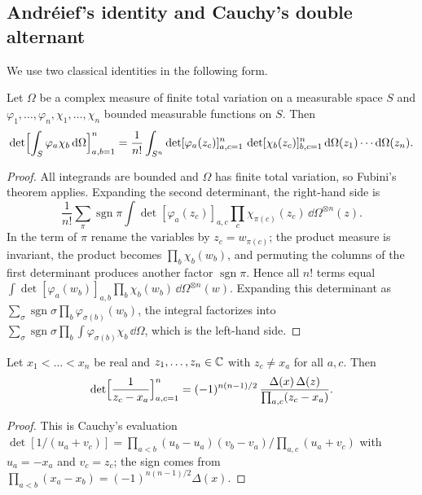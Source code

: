 \subsection{Andr\'eief's identity and Cauchy's double alternant}\label{subsec:andreief}

We use two classical identities in the following form.

\begin{lemma}\label{lem:andreief}
Let $\Omega$ be a complex measure of finite total variation on a measurable space $S$ and
$\varphi_1,\dots,\varphi_n,\chi_1,\dots,\chi_n$ bounded measurable functions on $S$. Then
\[
  \det\Bigl[\int_S\varphi_a\chi_b\,\mathrm{d}\Omega\Bigr]_{a,b=1}^n
  =\frac1{n!}\int_{S^n}\det[\varphi_a(z_c)]_{a,c=1}^n\,\det[\chi_b(z_c)]_{b,c=1}^n\,
   \mathrm{d}\Omega(z_1)\cdots\mathrm{d}\Omega(z_n).
\]
\end{lemma}

\begin{proof}
All integrands are bounded and $\Omega$ has finite total variation, so Fubini's theorem applies.
Expanding the second determinant, the right-hand side is
\[
  \frac1{n!}\sum_\pi\operatorname{sgn}\pi\int\det[\varphi_a(z_c)]_{a,c}
  \prod_c\chi_{\pi(c)}(z_c)\,\dd\Omega^{\otimes n}(z).
\]
In the term of $\pi$ rename the variables
by $z_c=w_{\pi(c)}$; the product measure is invariant, the product becomes
$\prod_b\chi_b(w_b)$, and permuting the columns of the first determinant produces another factor
$\operatorname{sgn}\pi$. Hence all $n!$ terms equal
$\int\det[\varphi_a(w_b)]_{a,b}\prod_b\chi_b(w_b)\,\dd\Omega^{\otimes n}(w)$. Expanding this
determinant as $\sum_\sigma\operatorname{sgn}\sigma\prod_b\varphi_{\sigma(b)}(w_b)$, the integral
factorizes into $\sum_\sigma\operatorname{sgn}\sigma\prod_b\int\varphi_{\sigma(b)}\chi_b\,\dd\Omega$,
which is the left-hand side.
\end{proof}

\begin{lemma}[Cauchy]\label{lem:cauchy}
Let $x_1<\dots<x_n$ be real and $z_1,\dots,z_n\in\mathbb{C}$ with $z_c\ne x_a$ for all $a,c$. Then
\[
  \det\Bigl[\frac1{z_c-x_a}\Bigr]_{a,c=1}^n
  =(-1)^{n(n-1)/2}\,\frac{\Delta(x)\,\Delta(z)}{\prod_{a,c}(z_c-x_a)}.
\]
\end{lemma}

\begin{proof}
This is Cauchy's evaluation $\det[1/(u_a+v_c)]=\prod_{a<b}(u_b-u_a)(v_b-v_a)/\prod_{a,c}(u_a+v_c)$
with $u_a=-x_a$ and $v_c=z_c$; the sign comes from $\prod_{a<b}(x_a-x_b)=(-1)^{n(n-1)/2}\Delta(x)$.
\end{proof}

